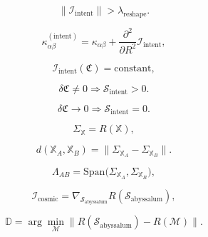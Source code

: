 \[
\|\mathcal{I}_{\mathrm{intent}}\| > \lambda_{\mathrm{reshape}}.
\]

\[
\kappa_{\alpha\beta}^{(\mathrm{intent})}
=
\kappa_{\alpha\beta}
+
\frac{\partial^2}{\partial R^2}
\mathcal{I}_{\mathrm{intent}},
\]

\[
\mathcal{I}_{\mathrm{intent}}(\mathfrak{C}) = \text{constant},
\]

\[
\delta \mathfrak{C} \ne 0 \Rightarrow \mathcal{S}_{\mathrm{intent}} > 0.
\]

\[
\delta \mathfrak{C} \to 0 \Rightarrow \mathcal{S}_{\mathrm{intent}} = 0.
\]

\[
\Sigma_{\mathbb{X}} = R(\mathbb{X}),
\]

\[
d(\mathbb{X}_A,\mathbb{X}_B)
=
\big\| \Sigma_{\mathbb{X}_A} - \Sigma_{\mathbb{X}_B} \big\|.
\]

\[
\Lambda_{AB}
=
\mathrm{Span}
\big(
\Sigma_{\mathbb{X}_A}, \Sigma_{\mathbb{X}_B}
\big),
\]

\[
\mathcal{I}_{\mathrm{cosmic}}
=
\nabla_{\mathcal{S}_{\mathrm{abyssalum}}} R(\mathcal{S}_{\mathrm{abyssalum}}),
\]

\[
\mathbb{D}
=
\arg\!\min_{\mathcal{M}}
\big\| R(\mathcal{S}_{\mathrm{abyssalum}}) - R(\mathcal{M}) \big\|.
\]

